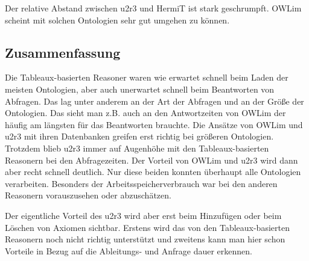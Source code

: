 Der relative Abstand zwischen u2r3 und HermiT ist stark geschrumpft. OWLim scheint mit solchen Ontologien sehr gut umgehen zu können.

\subsection{Zusammenfassung}
Die Tableaux-basierten Reasoner waren wie erwartet schnell beim Laden der meisten Ontologien, aber auch unerwartet schnell beim Beantworten von Abfragen. Das lag unter anderem an der Art der Abfragen und an der Größe der Ontologien. Das sieht man z.B. auch an den Antwortzeiten von OWLim der häufig am längsten für das Beantworten brauchte. Die Ansätze von OWLim und u2r3 mit ihren Datenbanken greifen erst richtig bei größeren  Ontologien. Trotzdem blieb u2r3 immer auf Augenhöhe mit den Tableaux-basierten Reasonern bei den Abfragezeiten. Der Vorteil von OWLim und u2r3 wird dann aber recht schnell deutlich. Nur diese beiden konnten überhaupt alle Ontologien verarbeiten. Besonders der Arbeitsspeicherverbrauch war bei den anderen Reasonern vorauszusehen oder abzuschätzen.

Der eigentliche Vorteil des u2r3 wird aber erst beim Hinzufügen oder beim Löschen von Axiomen sichtbar. Erstens wird das von den Tableaux-basierten Reasonern noch nicht richtig unterstützt und zweitens kann man hier schon Vorteile in Bezug auf die Ableitungs- und Anfrage dauer erkennen.